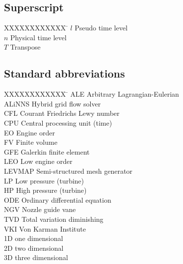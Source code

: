 \subsection*{Superscript}
\begin{tabbing}
XXXXXXXXXXXX \= \kill
$l$              \> Pseudo time level\\
$n$              \> Physical time level\\
$T$              \> Transpose\\
\end{tabbing}
%
%
\subsection*{Standard abbreviations}
\begin{tabbing}
XXXXXXXXXXXX \= \kill
ALE            \> Arbitrary Lagrangian-Eulerian\\
ALiNNS         \> Hybrid grid flow solver\\
CFL            \> Courant Friedrichs Lewy number\\
CPU            \> Central processing unit (time)\\
EO             \> Engine order\\
FV             \> Finite volume\\
GFE            \> Galerkin finite element\\
LEO            \> Low engine order\\
LEVMAP         \> Semi-structured mesh generator\\
LP             \> Low pressure (turbine)\\
HP             \> High pressure (turbine)\\
ODE            \> Ordinary differential equation\\
NGV            \> Nozzle guide vane\\
TVD            \> Total variation diminishing\\
VKI            \> Von Karman Institute\\
1D             \> one dimensional\\
2D             \> two dimensional\\
3D             \> three dimensional\\
\end{tabbing}

